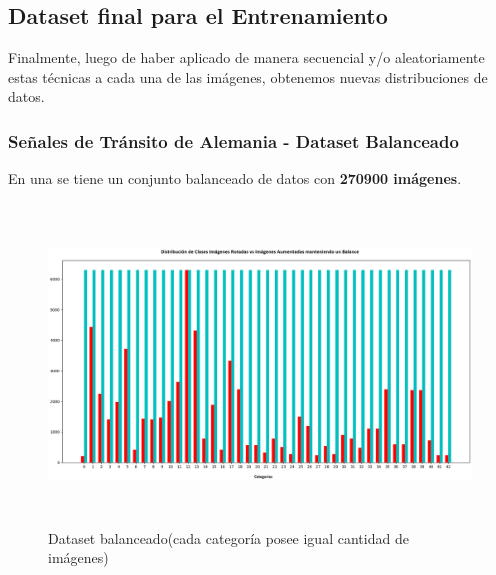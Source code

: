 	\newpage
	\subsection{Dataset final para el Entrenamiento}
		Finalmente, luego de haber aplicado de manera secuencial y/o aleatoriamente estas técnicas a cada una de las imágenes, obtenemos nuevas distribuciones de datos. 
		\subsubsection{Señales de Tránsito de Alemania - Dataset Balanceado }
			En una se tiene un conjunto balanceado de datos con {\bf 270900 imágenes}.
			\begin{figure}[H]
				\includegraphics[width=1\textwidth, height=8.5cm]{images/desarrollo/histograms/train_extended_balanced270900}
				\begin{center}
				\caption{\small{Dataset balanceado(cada categoría posee igual cantidad de imágenes)}}
				{\small{\fontsize{10}{16.8}\selectfont {Fuente: Elaboración propia}}}
				\end{center}

			\end{figure}

